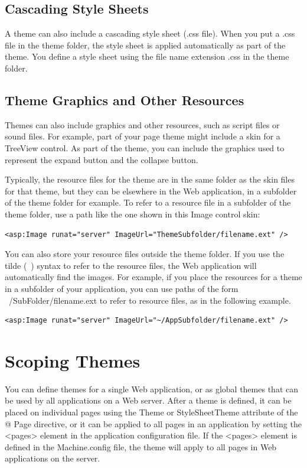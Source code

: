 \subsection{Cascading Style Sheets}
A theme can also include a cascading style sheet (.css file). When you put a .css file in the theme folder, the style sheet is applied automatically as part of the theme. You define a style sheet using the file name extension .css in the theme folder.

\subsection{Theme Graphics and Other Resources}
Themes can also include graphics and other resources, such as script files or sound files. For example, part of your page theme might include a skin for a TreeView control. As part of the theme, you can include the graphics used to represent the expand button and the collapse button.

Typically, the resource files for the theme are in the same folder as the skin files for that theme, but they can be elsewhere in the Web application, in a subfolder of the theme folder for example. To refer to a resource file in a subfolder of the theme folder, use a path like the one shown in this Image control skin:
\begin{lstlisting}
<asp:Image runat="server" ImageUrl="ThemeSubfolder/filename.ext" />
\end{lstlisting}
You can also store your resource files outside the theme folder. If you use the tilde (~) syntax to refer to the resource files, the Web application will automatically find the images. For example, if you place the resources for a theme in a subfolder of your application, you can use paths of the form ~/SubFolder/filename.ext to refer to resource files, as in the following example.
\begin{lstlisting}
<asp:Image runat="server" ImageUrl="~/AppSubfolder/filename.ext" />
\end{lstlisting}

\section{Scoping Themes}
You can define themes for a single Web application, or as global themes that can be used by all applications on a Web server. After a theme is defined, it can be placed on individual pages using the Theme or StyleSheetTheme attribute of the @ Page directive, or it can be applied to all pages in an application by setting the <pages> element in the application configuration file. If the <pages> element is defined in the Machine.config file, the theme will apply to all pages in Web applications on the server.


